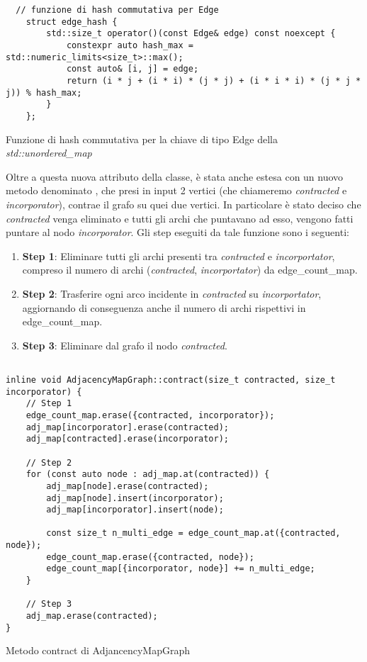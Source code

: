 \begin{listing}[!ht]
\begin{verbatim}
  // funzione di hash commutativa per Edge
    struct edge_hash {
        std::size_t operator()(const Edge& edge) const noexcept {
            constexpr auto hash_max = std::numeric_limits<size_t>::max();
            const auto& [i, j] = edge;
            return (i * j + (i * i) * (j * j) + (i * i * i) * (j * j * j)) % hash_max;
        }
    };
\end{verbatim}
\caption{Funzione di hash commutativa per la chiave di tipo Edge della \textit{std::unordered\_map}}
\label{listing:hash-fun}
\end{listing}

\noident Oltre a questa nuova attributo della classe,  è stata anche estesa con un nuovo metodo denominato , che presi in input 2 vertici (che chiameremo \textit{contracted} e  \textit{incorporator}), contrae il grafo su quei due vertici. In particolare è stato deciso che \textit{contracted} venga eliminato e tutti gli archi che puntavano ad esso, vengono fatti puntare al nodo \textit{incorporator}. Gli step eseguiti da tale funzione sono i seguenti:
\begin{enumerate}
    \item \textbf{Step 1}: Eliminare tutti gli archi presenti tra \textit{contracted} e \textit{incorportator}, compreso il numero di archi (\textit{contracted}, \textit{incorportator}) da edge\_count\_map.
    
    \item \textbf{Step 2}: Trasferire ogni arco incidente in \textit{contracted} su \textit{incorportator}, aggiornando di conseguenza anche il numero di archi rispettivi in edge\_count\_map.
    
     \item \textbf{Step 3}: Eliminare dal grafo il nodo \textit{contracted}.
\end{enumerate}

\begin{listing}[!ht]
\begin{verbatim}

inline void AdjacencyMapGraph::contract(size_t contracted, size_t incorporator) {
    // Step 1
    edge_count_map.erase({contracted, incorporator});
    adj_map[incorporator].erase(contracted);
    adj_map[contracted].erase(incorporator);

    // Step 2
    for (const auto node : adj_map.at(contracted)) {
        adj_map[node].erase(contracted);
        adj_map[node].insert(incorporator);
        adj_map[incorporator].insert(node);

        const size_t n_multi_edge = edge_count_map.at({contracted, node});
        edge_count_map.erase({contracted, node});
        edge_count_map[{incorporator, node}] += n_multi_edge;
    }

    // Step 3
    adj_map.erase(contracted);
}
\end{verbatim}
\caption{Metodo contract di AdjancencyMapGraph}
\label{listing:met-contract}
\end{listing}


